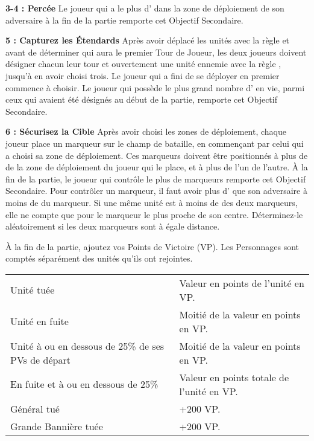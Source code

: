{\textbf{3-4 : Percée}\newline
Le joueur qui a le plus d'\scoringunits{} dans la zone de déploiement de son adversaire à la fin de la partie remporte cet Objectif Secondaire. 

\textbf{5 : Capturez les Étendards}\newline
Après avoir déplacé les unités avec la règle \vanguard{} et avant de déterminer qui aura le premier Tour de Joueur, les deux joueurs doivent désigner chacun leur tour et ouvertement une unité ennemie avec la règle \scoring{}, jusqu'à en avoir choisi trois. Le joueur qui a fini de se déployer en premier commence à choisir. Le joueur qui possède le plus grand nombre d'\scoringunits{} en vie, parmi ceux qui avaient été désignés au début de la partie, remporte cet Objectif Secondaire.

\textbf{6 : Sécurisez la Cible}\newline
Après avoir choisi les zones de déploiement, chaque joueur place un marqueur sur le champ de bataille, en commençant par celui qui a choisi sa zone de déploiement. Ces marqueurs doivent être positionnés à plus de  de la zone de déploiement du joueur qui le place, et à plus de  l'un de l'autre. À la fin de la partie, le joueur qui contrôle le plus de marqueurs remporte cet Objectif Secondaire. Pour contrôler un marqueur, il faut avoir plus d'\scoringunits{} que son adversaire à moins de  du marqueur. Si une même unité est à moins de  des deux marqueurs, elle ne compte que pour le marqueur le plus proche de son centre. Déterminez-le aléatoirement si les deux marqueurs sont à égale distance.

\vspace*{-20pt}

\begin{minipage}[c]{0.48\textwidth}
À la fin de la partie, ajoutez vos Points de Victoire (VP). Les Personnages sont comptés séparément des unités qu'ils ont rejointes.

\vspace*{5pt}
\begin{center}\begin{tabular}{>{\raggedleft}p{}p{}}
\hline
Unité tuée & Valeur en points de l'unité en VP. \tabularnewline
Unité en fuite & Moitié de la valeur en points en VP. \tabularnewline
Unité à ou en dessous de 25\% de ses PVs de départ & Moitié de la valeur en points en VP. \tabularnewline
En fuite et à ou en dessous de 25\% & Valeur en points totale de l'unité en VP. \tabularnewline
Général tué & +200 VP. \tabularnewline
Grande Bannière tuée & +200 VP. \tabularnewline
\hline
\end{tabular}\end{center}


\end{minipage}}
